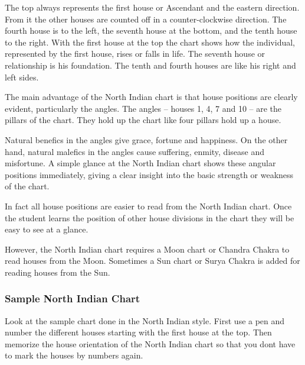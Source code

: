  

The top always represents the first house or Ascendant and the eastern direction. From it the other houses are counted off in a counter-clockwise direction. The fourth house is to the left, the seventh house at the bottom, and the tenth house to the right. With the first house at the top the chart shows how the individual, represented by the first house, rises or falls in life. The seventh house or relationship is his foundation. The tenth and fourth houses are like his right and left sides.

 

The main advantage of the North Indian chart is that house positions are clearly evident, particularly the angles. The angles – houses 1, 4, 7 and 10 – are the pillars of the chart. They hold up the chart like four pillars hold up a house.

 

Natural benefics in the angles give grace, fortune and happiness. On the other hand, natural malefics in the angles cause suffering, enmity, disease and misfortune. A simple glance at the North Indian chart shows these angular positions immediately, giving a clear insight into the basic strength or weakness of the chart.

 

In fact all house positions are easier to read from the North Indian chart. Once the student learns the position of other house divisions in the chart they will be easy to see at a glance.

 

However, the North Indian chart requires a Moon chart or Chandra Chakra to read houses from the Moon. Sometimes a Sun chart or Surya Chakra is added for reading houses from the Sun.

 

\subsubsection{Sample North Indian Chart}

 

Look at the sample chart done in the North Indian style. First use a pen and number the different houses starting with the first house at the top. Then memorize the house orientation of the North Indian chart so that you dont have to mark the houses by numbers again.

